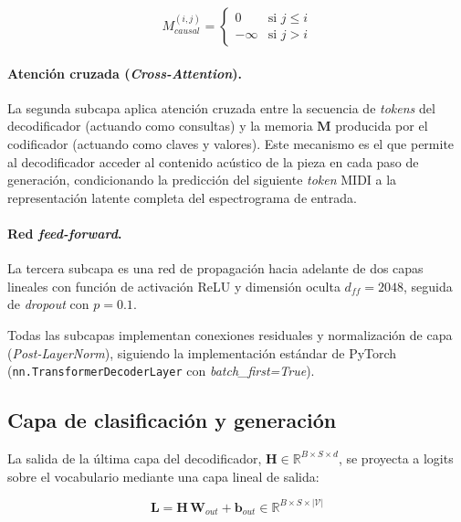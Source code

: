 \begin{equation}
    M_{causal}^{(i,j)} = \begin{cases} 0 & \text{si } j \leq i \\ -\infty & \text{si } j > i \end{cases}
    \label{eq:mascara_causal}
\end{equation}

\paragraph{Atención cruzada (\textit{Cross-Attention}).}
La segunda subcapa aplica atención cruzada entre la secuencia de \textit{tokens} del
decodificador (actuando como consultas) y la memoria $\mathbf{M}$ producida por el
codificador (actuando como claves y valores). Este mecanismo es el que permite al
decodificador acceder al contenido acústico de la pieza en cada paso de generación,
condicionando la predicción del siguiente \textit{token} MIDI a la representación latente
completa del espectrograma de entrada.

\paragraph{Red \textit{feed-forward}.}
La tercera subcapa es una red de propagación hacia adelante de dos capas lineales con
función de activación ReLU y dimensión oculta $d_{ff} = 2048$, seguida de \textit{dropout}
con $p = 0.1$.

Todas las subcapas implementan conexiones residuales y normalización de capa
(\textit{Post-LayerNorm}), siguiendo la implementación estándar de PyTorch \newline
(\texttt{nn.TransformerDecoderLayer} con \textit{batch\_first=True}).

\subsection{Capa de clasificación y generación}

La salida de la última capa del decodificador,
$\mathbf{H} \in \mathbb{R}^{B \times S \times d}$, se proyecta a logits sobre el
vocabulario mediante una capa lineal de salida:

\begin{equation}
    \mathbf{L} = \mathbf{H} \, \mathbf{W}_{out} + \mathbf{b}_{out}
    \in \mathbb{R}^{B \times S \times |\mathcal{V}|}
    \label{eq:logits}
\end{equation}

